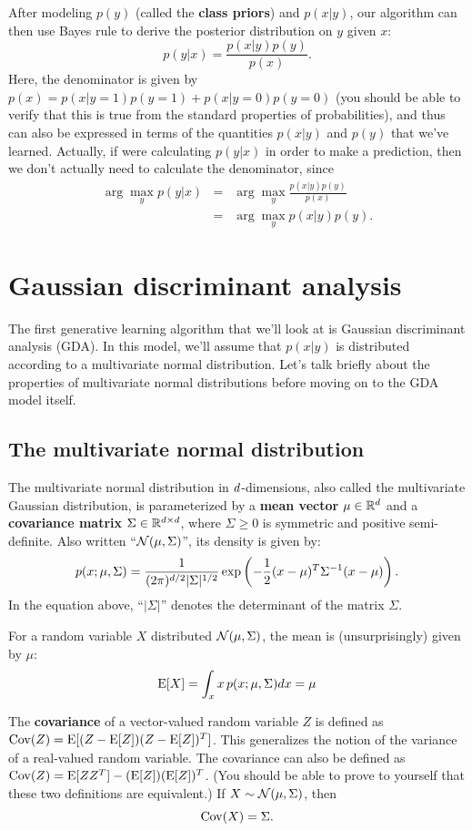 \documentclass{article}
\begin{document}
After modeling $p(y)$ (called the {\bf class priors}) and $p(x|y)$, our algorithm can then
use Bayes rule to derive the posterior distribution on $y$ given $x$:
\[
p(y|x) = \frac{p(x|y)p(y)}{p(x)}.
\]
Here, the denominator is given by $p(x) = p(x|y=1)p(y=1)  + p(x|y=0)p(y=0)$ (you should be able
to verify that this is true from the standard properties of probabilities), and thus can
also be expressed in terms of the quantities $p(x|y)$ and $p(y)$ that we've learned.
Actually, if were calculating $p(y|x)$ in order to make a prediction, then we don't
actually need to calculate the denominator, since
\begin{eqnarray*}
\arg \max_y p(y|x) &=& \arg \max_y \frac{p(x|y)p(y)}{p(x)} \\
&=& \arg \max_y p(x|y)p(y).
\end{eqnarray*}

\section{Gaussian discriminant analysis}

The first generative learning algorithm that we'll look at is Gaussian
discriminant analysis (GDA).  In this model, we'll assume that $p(x|y)$ is distributed according to
a multivariate normal distribution.  Let's talk briefly about the properties of
multivariate normal distributions before moving on to the GDA model itself.

\subsection{The multivariate normal distribution}

The multivariate normal distribution in ${d}$-dimensions,
also called the multivariate Gaussian distribution, is parameterized by a
{\bf mean vector} $\mu \in {\mathbb R}^{d}$ and a {\bf covariance matrix} $\Sigma \in {\mathbb R}^{{d}\times {d}}$,
where $\Sigma \geq 0$ is symmetric and positive semi-definite.  Also written ``${\cal N}(\mu,\Sigma)$'',
its density is given by:
\[
p(x;\mu,\Sigma) = \frac{1}{(2\pi)^{{d}/2} |\Sigma|^{1/2}} \exp\left(-\frac{1}{2} (x-\mu)^T\Sigma^{-1}(x-\mu)\right).
\]
In the equation above, ``$|\Sigma|$'' denotes the determinant of the matrix $\Sigma$.

For a random variable $X$ distributed ${\cal N}(\mu,\Sigma)$, the mean is (unsurprisingly)
given by $\mu$:
\[
{\rm E}[X] = \int_x x \,p(x;\mu,\Sigma) dx = \mu
\]

The {\bf covariance} of a vector-valued random variable $Z$ is
defined as ${\rm Cov}(Z) = {\rm E}[ (Z - {\rm E}[Z]) (Z-{\rm E}[Z])^T ]$.  This generalizes
the notion of the variance of a real-valued random variable.  The covariance can
also be defined as ${\rm Cov}(Z) = {\rm E}[ZZ^T] - ({\rm E}[Z])({\rm E}[Z])^T$.  (You should
be able to prove to yourself that these two definitions are equivalent.)
If $X \sim {\cal N}(\mu,\Sigma)$, then
\[
{\rm Cov}(X) = \Sigma.
\]
\end{document}
